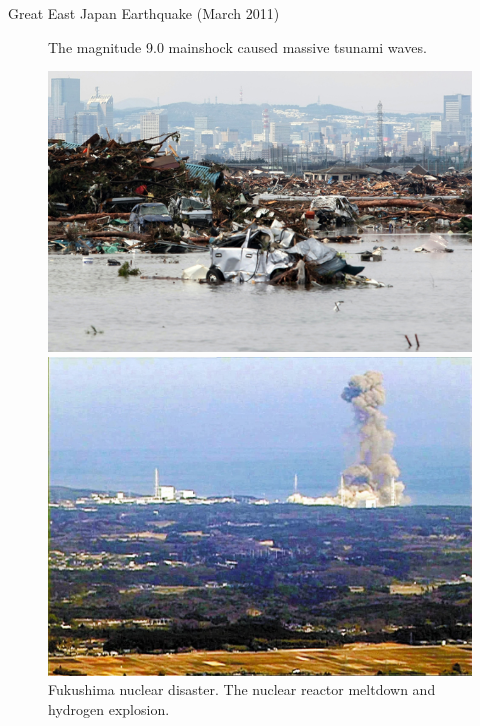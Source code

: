\documentclass[serif, aspectratio=169]{beamer}
\begin{document}
\begin{frame}{Great East Japan Earthquake (March 2011)}
\begin{minipage}{1.00\textwidth}
\begin{figure}[h!]
      \begin{minipage}[t]{0.48\textwidth}
        \centering
        \caption*{The magnitude 9.0 mainshock caused massive tsunami waves.}
        \includegraphics[width=\textwidth,height=0.8\textwidth]{Tsunami.jpg}
      \end{minipage}
      \hfill
      \begin{minipage}[t]{0.48\textwidth}
        \centering
        
        \caption*{Fukushima nuclear disaster. The nuclear reactor meltdown and hydrogen explosion.}
        \includegraphics[width=\textwidth,height=0.8\textwidth]{Nuclear_explosion.png}
      \end{minipage}

    \end{figure}
    
    \end{minipage}
\end{frame}
\end{document}
